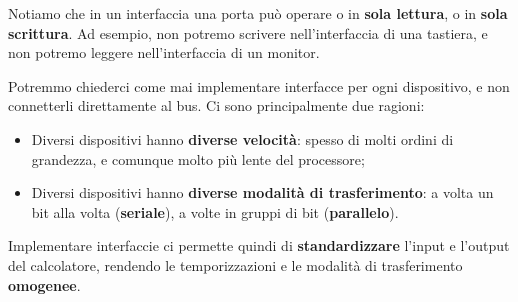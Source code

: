 \documentclass[a4paper,11pt]{article}
\begin{document}
Notiamo che in un interfaccia una porta può operare o in \textbf{sola lettura}, o in \textbf{sola scrittura}.
Ad esempio, non potremo scrivere nell'interfaccia di una tastiera, e non potremo leggere nell'interfaccia di un monitor.

Potremmo chiederci come mai implementare interfacce per ogni dispositivo, e non connetterli direttamente al bus.
Ci sono principalmente due ragioni:
\begin{itemize}
	\item Diversi dispositivi hanno \textbf{diverse velocità}: spesso di molti ordini di grandezza, e comunque molto più lente del processore;
	\item Diversi dispositivi hanno \textbf{diverse modalità di trasferimento}: a volta un bit alla volta (\textbf{seriale}), a volte in gruppi di bit (\textbf{parallelo}).
\end{itemize}

Implementare interfaccie ci permette quindi di \textbf{standardizzare} l'input e l'output del calcolatore, rendendo le temporizzazioni e le modalità di trasferimento \textbf{omogenee}.
\end{document}

